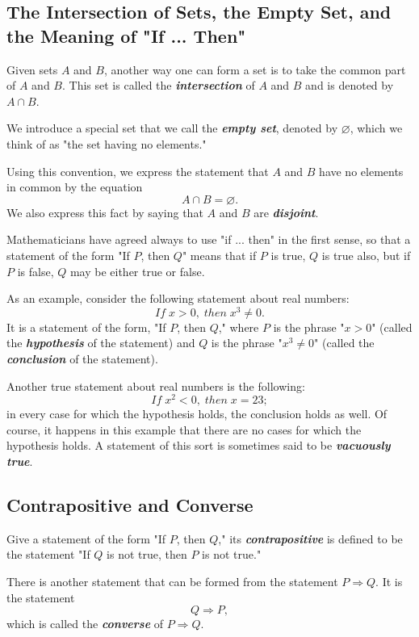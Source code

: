 \documentclass[a4paper,12pt,twoside,openany]{book}
\begin{document}
\subsection{The Intersection of Sets, the Empty Set, and the Meaning of "If ... Then"}

Given sets $A$ and $B$, another way one can form a set is to take the common part of $A$ and $B$. This set is called the \textit{\textbf{intersection}} of $A$ and $B$ and is denoted by $A\cap B$.

We introduce a special set that we call the \textit{\textbf{empty set}}, denoted by $\varnothing$, which we think of as "the set having no elements."

Using this convention, we express the statement that $A$ and $B$ have no elements in common by the equation $$A\cap B=\varnothing.$$ We also express this fact by saying that $A$ and $B$ are \textit{\textbf{disjoint}}.

Mathematicians have agreed always to use "if ... then" in the first sense, so that a statement of the form "If $P$, then $Q$" means that if $P$ is true, $Q$ is true also, but if $P$ is false, $Q$ may be either true or false.

As an example, consider the following statement about real numbers: $$If\;x>0,\;then\;x^3\ne 0.$$ It is a statement of the form, "If $P$, then $Q$," where $P$ is the phrase "$x>0$" (called the \textit{\textbf{hypothesis}} of the statement) and $Q$ is the phrase "$x^3\ne 0$" (called the \textit{\textbf{conclusion}} of the statement).

Another true statement about real numbers is the following: $$If\;x^2<0,\;then\;x=23;$$ in every case for which the hypothesis holds, the conclusion holds as well. Of course, it happens in this example that there are no cases for which the hypothesis holds. A statement of this sort is sometimes said to be \textit{\textbf{vacuously true}}.

\subsection{Contrapositive and Converse}

Give a statement of the form "If $P$, then $Q$," its \textit{\textbf{contrapositive}} is defined to be the statement "If $Q$ is not true, then $P$ is not true."

There is another statement that can be formed from the statement $P\Rightarrow Q$. It is the statement $$Q\Longrightarrow P,$$ which is called the \textit{\textbf{converse}} of $P\Rightarrow Q$.
\end{document}
